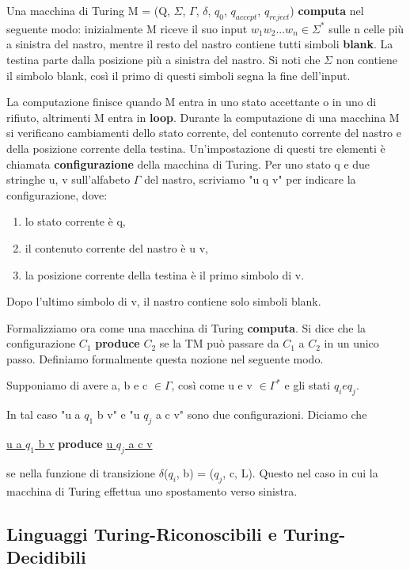 \documentclass{article}
\begin{document}
Una macchina di Turing M = (Q, $\Sigma$, $\Gamma$, $\delta$, $q_0$,
$q_{accept}$, $q_{reject}$) \textbf{computa} nel seguente modo: inizialmente M
riceve il suo input $w_1w_2...w_n \in \Sigma^*$ sulle n celle più a sinistra del
nastro, mentre il resto del nastro contiene tutti simboli \textbf{blank}. La
testina parte dalla posizione più a sinistra del nastro. Si noti che $\Sigma$
non contiene il simbolo blank, così il primo di questi simboli segna la fine
dell'input.

La computazione finisce quando M entra in uno stato accettante o in uno di
rifiuto, altrimenti M entra in \textbf{loop}. Durante la computazione di una
macchina M si verificano cambiamenti dello stato corrente, del contenuto
corrente del nastro e della posizione corrente della testina. Un'impostazione di
questi tre elementi è chiamata \textbf{configurazione} della macchina di Turing.
Per uno stato q e due stringhe u, v sull'alfabeto $\Gamma$ del nastro, scriviamo
"u q v" per indicare la configurazione, dove:

\begin{enumerate}
    \item lo stato corrente è q,
    \item il contenuto corrente del nastro è u v,
    \item la posizione corrente della testina è il primo simbolo di v.
\end{enumerate}

Dopo l'ultimo simbolo di v, il nastro contiene solo simboli blank.

Formalizziamo ora come una macchina di Turing \textbf{computa}. Si dice che la
configurazione $C_1$ \textbf{produce} $C_2$ se la TM può passare da $C_1$ a
$C_2$ in un unico passo. Definiamo formalmente questa nozione nel seguente modo.

Supponiamo di avere a, b e c $\in \Gamma$, così come u e v $\in \Gamma^*$ e gli
stati $q_i e q_j$.

In tal caso "u a $q_1$ b v" e "u $q_j$ a c v" sono due configurazioni. Diciamo
che

\begin{center}
    \underline{u a $q_1$ b v} \textbf{produce} \underline{u $q_j$ a c v}
\end{center}

se nella funzione di transizione $\delta$($q_i$, b) = ($q_j$, c, L). Questo nel
caso in cui la macchina di Turing effettua uno spostamento verso sinistra.

\subsection{Linguaggi Turing-Riconoscibili e Turing-Decidibili}
\end{document}
